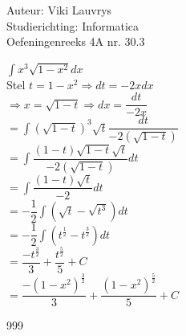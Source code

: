 \documentclass[a4paper]{article}
\begin{document}
  
\noindent \large Auteur: Viki	Lauvrys \\
\noindent \large Studierichting: Informatica\\
\noindent \large Oefeningenreeks 4A nr. 30.3\\

\medskip

\normalsize

$ \displaystyle\int x^3 \sqrt{1 - x^2} dx $ \\

Stel $ t = 1 -x^2 \Rightarrow dt = -2x dx $ \\

$ \Rightarrow x = \sqrt{1 -t} \Rightarrow dx = \dfrac{dt}{-2x} $ \\

$ = \displaystyle\int \left( \sqrt{1 -t} \right)^3 \sqrt{t} \dfrac{dt}{-2(\sqrt{1 -t})} $ \\

$ = \displaystyle\int \dfrac{(1 -t) \sqrt{1-t} \sqrt{t}}{-2 \left( \sqrt{1-t} \right)} dt $ \\

$ = \displaystyle\int \dfrac{(1 -t) \sqrt{t}}{-2} dt $ \\

$ = - \dfrac{1}{2} \displaystyle\int \left( \sqrt{t} - \sqrt{t^3} \right) dt $ \\

$ = - \dfrac{1}{2} \displaystyle\int \left( t^{\tfrac{1}{2}} - t^{\tfrac{3}{2}} \right) dt $ \\

$ = \dfrac{-t^{\tfrac{3}{2}}}{3} + \dfrac{t^{\tfrac{5}{2}}}{5} + C $ \\

$ = \dfrac{-(1 - x^2)^{\tfrac{3}{2}}}{3} + \dfrac{(1 - x^2)^{\tfrac{5}{2}}}{5} +  C$ \\


\begin{thebibliography}{999}
\end{thebibliography}
\end{document}
